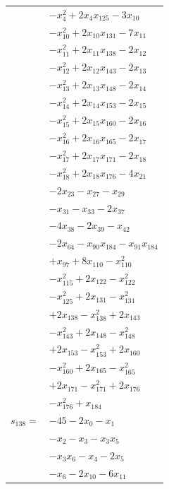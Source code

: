 \begin{longtable}{@{}r@{\;}l@{}}
 & \(\displaystyle -x_{4}^{2} +2x_{4}x_{125} -3x_{10}\) \\
 & \(\displaystyle -x_{10}^{2} +2x_{10}x_{131} -7x_{11}\) \\
 & \(\displaystyle -x_{11}^{2} +2x_{11}x_{138} -2x_{12}\) \\
 & \(\displaystyle -x_{12}^{2} +2x_{12}x_{143} -2x_{13}\) \\
 & \(\displaystyle -x_{13}^{2} +2x_{13}x_{148} -2x_{14}\) \\
 & \(\displaystyle -x_{14}^{2} +2x_{14}x_{153} -2x_{15}\) \\
 & \(\displaystyle -x_{15}^{2} +2x_{15}x_{160} -2x_{16}\) \\
 & \(\displaystyle -x_{16}^{2} +2x_{16}x_{165} -2x_{17}\) \\
 & \(\displaystyle -x_{17}^{2} +2x_{17}x_{171} -2x_{18}\) \\
 & \(\displaystyle -x_{18}^{2} +2x_{18}x_{176} -4x_{21}\) \\
 & \(\displaystyle -2x_{23} -x_{27} -x_{29}\) \\
 & \(\displaystyle -x_{31} -x_{33} -2x_{37}\) \\
 & \(\displaystyle -4x_{38} -2x_{39} -x_{42}\) \\
 & \(\displaystyle -2x_{64} -x_{90}x_{184} -x_{91}x_{184}\) \\
 & \(\displaystyle +x_{97} +8x_{110} -x_{110}^{2}\) \\
 & \(\displaystyle -x_{115}^{2} +2x_{122} -x_{122}^{2}\) \\
 & \(\displaystyle -x_{125}^{2} +2x_{131} -x_{131}^{2}\) \\
 & \(\displaystyle +2x_{138} -x_{138}^{2} +2x_{143}\) \\
 & \(\displaystyle -x_{143}^{2} +2x_{148} -x_{148}^{2}\) \\
 & \(\displaystyle +2x_{153} -x_{153}^{2} +2x_{160}\) \\
 & \(\displaystyle -x_{160}^{2} +2x_{165} -x_{165}^{2}\) \\
 & \(\displaystyle +2x_{171} -x_{171}^{2} +2x_{176}\) \\
 & \(\displaystyle -x_{176}^{2} +x_{184}\) \\[3pt]
\(s_{138}=\) & \(\displaystyle -45 -2x_{0} -x_{1}\) \\
 & \(\displaystyle -x_{2} -x_{3} -x_{3}x_{5}\) \\
 & \(\displaystyle -x_{3}x_{6} -x_{4} -2x_{5}\) \\
 & \(\displaystyle -x_{6} -2x_{10} -6x_{11}\) \\

\end{longtable}
